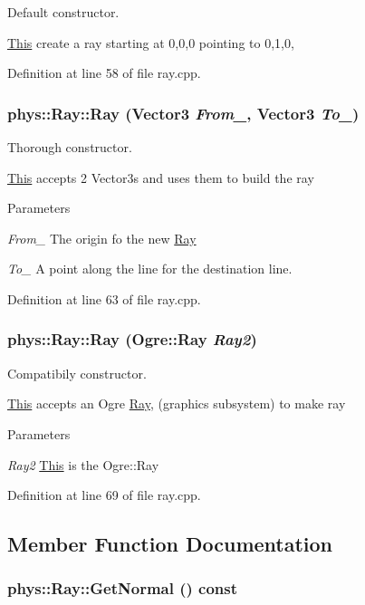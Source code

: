 Default constructor. 

\hyperlink{structThis}{This} create a ray starting at 0,0,0 pointing to 0,1,0, 

Definition at line 58 of file ray.cpp.

\hypertarget{classphys_1_1Ray_aa6123ef37a2351e6cca3954c23212379}{
\subsubsection[{Ray}]{\setlength{\rightskip}{0pt plus 5cm}phys::Ray::Ray ({\bf Vector3} {\em From\_\-}, \/  {\bf Vector3} {\em To\_\-})}}
\label{df/d57/classphys_1_1Ray_aa6123ef37a2351e6cca3954c23212379}


Thorough constructor. 

\hyperlink{structThis}{This} accepts 2 Vector3s and uses them to build the ray 
\begin{DoxyParams}{Parameters}
\item[{\em From\_\-}]The origin fo the new \hyperlink{classphys_1_1Ray}{Ray} \item[{\em To\_\-}]A point along the line for the destination line. \end{DoxyParams}


Definition at line 63 of file ray.cpp.

\hypertarget{classphys_1_1Ray_a395485ffe19e6a53966730c01a2781c1}{
\subsubsection[{Ray}]{\setlength{\rightskip}{0pt plus 5cm}phys::Ray::Ray (Ogre::Ray {\em Ray2})}}
\label{df/d57/classphys_1_1Ray_a395485ffe19e6a53966730c01a2781c1}


Compatibily constructor. 

\hyperlink{structThis}{This} accepts an Ogre \hyperlink{classphys_1_1Ray}{Ray}, (graphics subsystem) to make ray 
\begin{DoxyParams}{Parameters}
\item[{\em Ray2}]\hyperlink{structThis}{This} is the Ogre::Ray \end{DoxyParams}


Definition at line 69 of file ray.cpp.



\subsection{Member Function Documentation}
\hypertarget{classphys_1_1Ray_a7445c25acb6ce865ef85e7ada829ccba}{
\subsubsection[{GetNormal}]{ phys::Ray::GetNormal () const}}
\label{df/d57/classphys_1_1Ray_a7445c25acb6ce865ef85e7ada829ccba}


